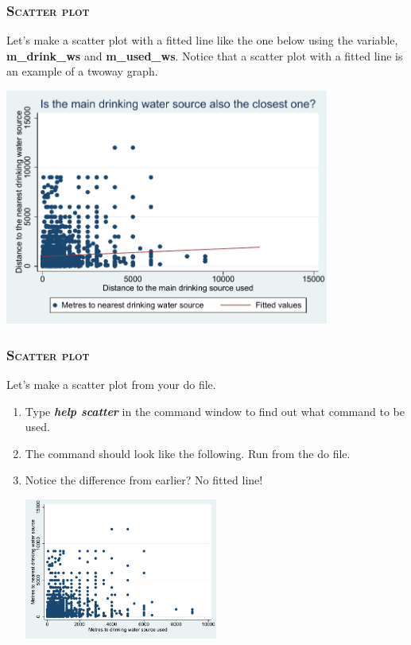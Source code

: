 \documentclass[10pt]{beamer}
\begin{document}
	\begin{frame}
	\frametitle{\textsc{Scatter plot}}
		Let's make a scatter plot with a fitted line like the one below using the variable, \textbf{m\_drink\_ws} and \textbf{m\_used\_ws}.
		Notice that a scatter plot with a fitted line is an example of a twoway graph.
		\vspace{1mm}
	
\begin{center}
    \includegraphics[width=0.8\textwidth]{scatter_1.pdf}
\end{center}
	\end{frame}
	
	\begin{frame}
	\frametitle{\textsc{Scatter plot}}	
		 Let's make a scatter plot from your do file.
		\begin{enumerate}
			 \item Type \textbf{\textit{help scatter}} in the command window to find out what command to be used.
			 \onslide<2-> \item The command should look like the following. Run from the do file.
		
\begin{stlog}\end{stlog}
			\vspace{1mm}
			 \item Notice the difference from earlier? No fitted line!
			\vspace{1mm}
		
\begin{center}
    \includegraphics[width=0.5\textwidth]{scatter_2.pdf}
\end{center}
		\end{enumerate}
	\end{frame}
	
\end{document}
